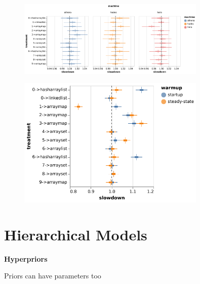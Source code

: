 \documentclass[aspectratio=169,xcolor=svgnames]{beamer}
\begin{document}
\begin{frame}
  \begin{figure}[ht]
    \centering
    \includegraphics[width=0.8\textwidth]{figures/plot_effect_machine_bloat.pdf}
  \end{figure}
\end{frame}

\begin{frame}
  \begin{figure}[ht]
    \centering
    \includegraphics[width=0.8\textwidth]{figures/bayesian-estimate-context-warmup-bloat.pdf}
  \end{figure}
\end{frame}

\section{Hierarchical Models}

\begin{frame}
  \center
  \textbf{Hyperpriors}

  {Priors can have parameters too}

  \pause

  \huge
  {}

\end{frame}
\end{document}
